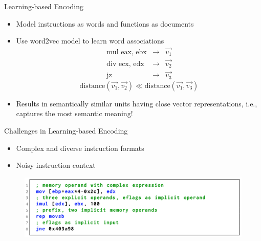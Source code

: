 \documentclass{beamer}
\begin{document}
\begin{frame}{Learning-based Encoding}
	
	\begin{itemize}
		\item Model instructions as words and functions as documents
		\item Use word2vec model to learn word associations %
		\begin{eqnarray*}
			\textrm{mul eax, ebx} &\rightarrow& \vec{v_1} \\
			\textrm{div ecx, edx} &\rightarrow& \vec{v_2} \\
			\textrm{jz} &\rightarrow& \vec{v_3}
		\end{eqnarray*}
		$$\textrm{distance}(\vec{v_1}, \vec{v_2}) \ll \textrm{distance}(\vec{v_1}, \vec{v_3})$$
		\item Results in semantically similar units having close vector representations, i.e., captures the most semantic meaning!
	\end{itemize}
	
\end{frame}

\begin{frame}{Challenges in Learning-based Encoding}
	
	\begin{itemize}
		\item Complex and diverse instruction formats
		\item Noisy instruction context
	\end{itemize}

	\begin{figure}[h]
	\includegraphics[scale=.25]{images/complex-diverse-instructions.png}
	\end{figure}
	
\end{frame}
\end{document}
